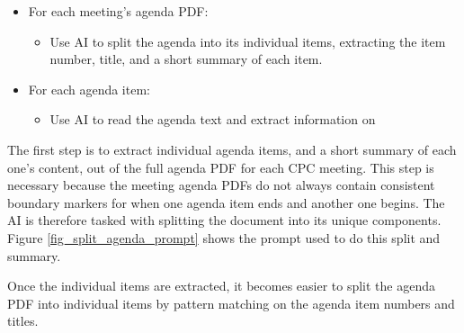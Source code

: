 \begin{itemize}
\item For each meeting's agenda PDF:
    \begin{itemize}
    \item Use AI to split the agenda into its individual items, extracting the item number, title, and a short summary of each item.
    \end{itemize}
\item For each agenda item:
    \begin{itemize}
    \item Use AI to read the agenda text and extract information on 
    \end{itemize}
\end{itemize}

The first step is to extract individual agenda items, and a short summary of each one's content, out of the full agenda PDF for each CPC meeting. This step is necessary because the meeting agenda PDFs do not always contain consistent boundary markers for when one agenda item ends and another one begins. The AI is therefore tasked with splitting the document into its unique components. Figure \ref{fig_split_agenda_prompt} shows the prompt used to do this split and summary.

Once the individual items are extracted, it becomes easier to split the agenda PDF into individual items by pattern matching on the agenda item numbers and titles.  

